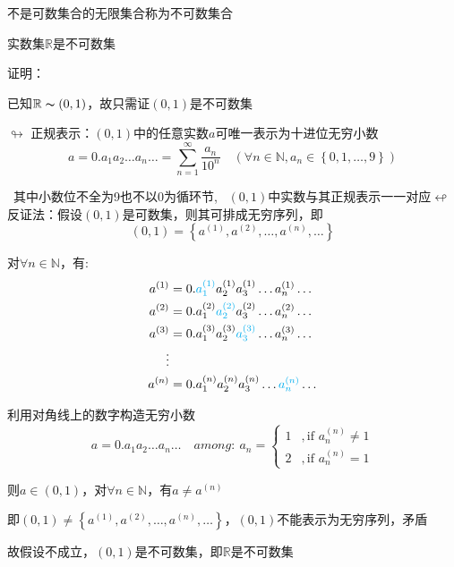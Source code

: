 \begin{td}
不是可数集合的无限集合称为不可数集合    
\end{td}

\begin{td}
实数集$\mathbb{R}$是不可数集    
\end{td}
\noindent 证明：
\par 已知$\mathbb{R} \thicksim \left(0,1\right) $，故只需证$\left(0,1\right) $是不可数集
\par $\looparrowright$ 正规表示：$\left(0,1\right) $中的任意实数$a$可唯一表示为十进位无穷小数
$$a = 0.a_{1}a_{2}\dots a_{n}\dots = \sum \limits_{n=1}^{\infty}\dfrac{a_{n}}{10^{n}} \quad \left(\forall n \in \mathbb{N},a_{n} \in \left\{0,1,\dots,9\right\} \right) $$
\par \quad \ 其中小数位不全为9也不以0为循环节, \ $\left(0,1\right) $中实数与其正规表示一一对应$\looparrowleft $
\\ 反证法：假设$\left(0,1\right) $是可数集，则其可排成无穷序列，即
$$\left(0,1\right) = \left\{a^{\left(1\right) },a^{\left(2\right) },\dots,a^{\left(n\right) },\dots\right\} $$
\par \quad \quad 对$\forall n \in \mathbb{N}$，有:
\begin{align*}
    a^{\left(1\right) } & = 0.\textcolor{cyan}{a_{1}^{\left(1\right)}}a_{2}^{\left(1\right)}a_{3}^{\left(1\right)}\dots a_{n}^{\left(1\right)} \dots\\
    a^{\left(2\right) } & = 0.a_{1}^{\left(2\right)}\textcolor{cyan}{a_{2}^{\left(2\right)}}a_{3}^{\left(2\right)}\dots a_{n}^{\left(2\right)} \dots\\
    a^{\left(3\right) } & = 0.a_{1}^{\left(3\right)}a_{2}^{\left(3\right)}\textcolor{cyan}{a_{3}^{\left(3\right)}}\dots a_{n}^{\left(3\right)} \dots\\
    \vdots \\
    a^{\left(n\right) } & = 0.a_{1}^{\left(n\right)}a_{2}^{\left(n\right)}a_{3}^{\left(n\right)}\dots \textcolor{cyan}{a_{n}^{\left(n\right)}} \dots
\end{align*}
\par \quad \quad 利用对角线上的数字构造无穷小数
$$a = 0.a_{1}a_{2}\dots a_{n} \dots \quad among: \ a_{n} = 
\begin{cases} 
    1 & ,\text{if } a_{n}^{\left(n\right)} \neq 1\\ 
    2 & ,\text{if } a_{n}^{\left(n\right)} = 1
\end{cases} $$
\par \quad \quad 则$a \in \left(0,1\right)$，对$\forall n \in \mathbb{N}$，有$a \neq a^{\left(n\right)}$
\par \quad \quad 即$\left(0,1\right) \neq \left\{a^{\left(1\right) },a^{\left(2\right) },\dots,a^{\left(n\right) },\dots\right\} $，$\left(0,1\right)$不能表示为无穷序列，矛盾
\par \quad \quad 故假设不成立，$\left(0,1\right)$是不可数集，即$\mathbb{R}$是不可数集

